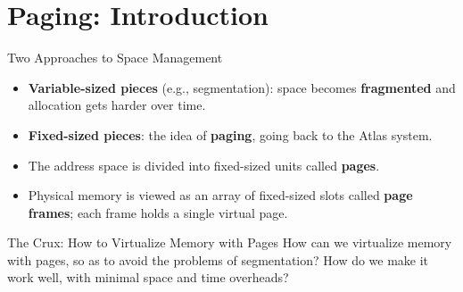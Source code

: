 \section{Paging: Introduction}

\begin{frame}{Two Approaches to Space Management}

\begin{itemize}
    \item \textbf{Variable-sized pieces} (e.g., segmentation):
          space becomes \textbf{fragmented} and allocation gets harder over time.
    \item \textbf{Fixed-sized pieces}: the idea of \textbf{paging},
          going back to the Atlas system.
    \item The address space is divided into fixed-sized units called \textbf{pages}.
    \item Physical memory is viewed as an array of fixed-sized slots called
          \textbf{page frames}; each frame holds a single virtual page.
\end{itemize}

\begin{block}{The Crux: How to Virtualize Memory with Pages}
How can we virtualize memory with pages, so as to avoid the problems of
segmentation? How do we make it work well, with minimal space and time
overheads?
\end{block}

\end{frame}

